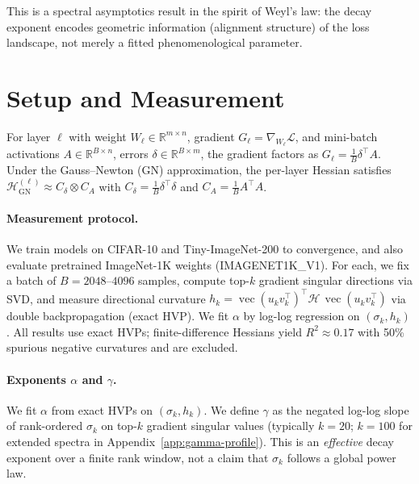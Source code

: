 \documentclass{article}
\DeclareMathOperator{\vecop}{vec}
\begin{document}
This is a spectral asymptotics result in the spirit of Weyl's law: the decay exponent encodes geometric information (alignment structure) of the loss landscape, not merely a fitted phenomenological parameter.

\section{Setup and Measurement}\label{sec:setup}

For layer $\ell$ with weight $W_\ell \in \mathbb{R}^{m \times n}$, gradient $G_\ell = \nabla_{W_\ell}\mathcal{L}$, and mini-batch activations $A \in \mathbb{R}^{B \times n}$, errors $\delta \in \mathbb{R}^{B \times m}$, the gradient factors as $G_\ell = \frac{1}{B}\delta^\top A$. Under the Gauss--Newton (GN) approximation, the per-layer Hessian satisfies $\mathcal{H}_{\mathrm{GN}}^{(\ell)} \approx C_\delta \otimes C_A$ with $C_\delta = \frac{1}{B}\delta^\top\delta$ and $C_A = \frac{1}{B}A^\top A$.

\paragraph{Measurement protocol.} We train models on CIFAR-10 and Tiny-ImageNet-200 to convergence, and also evaluate pretrained ImageNet-1K weights (IMAGENET1K\_V1). For each, we fix a batch of $B=2048$--$4096$ samples, compute top-$k$ gradient singular directions via SVD, and measure directional curvature $h_k = \vecop(u_k v_k^\top)^\top \mathcal{H}\, \vecop(u_k v_k^\top)$ via double backpropagation (exact HVP). We fit $\alpha$ by log-log regression on $(\sigma_k, h_k)$. All results use exact HVPs; finite-difference Hessians yield $R^2 \approx 0.17$ with 50\% spurious negative curvatures and are excluded.


\paragraph{Exponents $\alpha$ and $\gamma$.} We fit $\alpha$ from exact HVPs on $(\sigma_k, h_k)$. We define $\gamma$ as the negated log-log slope of rank-ordered $\sigma_k$ on top-$k$ gradient singular values (typically $k{=}20$; $k{=}100$ for extended spectra in Appendix~\ref{app:gamma-profile}). This is an \emph{effective} decay exponent over a finite rank window, not a claim that $\sigma_k$ follows a global power law.
\end{document}
